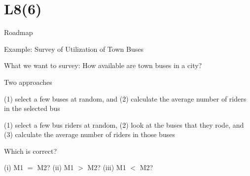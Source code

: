 \section{L8(6)}
\begin{frame}{Roadmap}

\plitemsep 0.2in

\bce[(1)]

\item {}
\item {}

\item {}

\item {}

\item {}

\item {}

  \ece

\end{frame}

\begin{frame}{Example: Survey of Utilization of Town Buses}

\plitemsep 0.15in

\bci

\item<1-> What we want to survey: How available are town buses in a city?

\item<2-> Two approaches

  \bce[M1.]
  \item<3-> (1) select a few buses at random, and (2) calculate the
    average number of riders in the selected bus

  \item<4-> (1) select a few bus riders at random, (2) look at the buses
    that they rode, and (3) calculate the average number of riders in
    those buses
    \ece

\item<5-> Which is correct?

  \item<6-> (i) M1 $=$ M2? (ii) M1 $>$ M2? (iii) M1 $<$ M2?    



  

  \eci

\end{frame}


